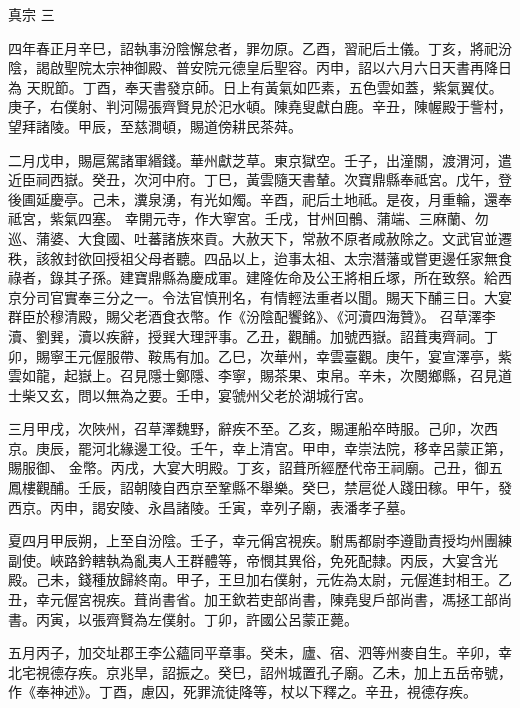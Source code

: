 
\begin{pinyinscope}

 真宗
 三



 四年春正月辛巳，詔執事汾陰懈怠者，罪勿原。乙酉，習祀后土儀。丁亥，將祀汾陰，謁啟聖院太宗神御殿、普安院元德皇后聖容。丙申，詔以六月六日天書再降日為
 天貺節。丁酉，奉天書發京師。日上有黃氣如匹素，五色雲如蓋，紫氣翼仗。庚子，右僕射、判河陽張齊賢見於汜水頓。陳堯叟獻白鹿。辛丑，陳幄殿于訾村，望拜諸陵。甲辰，至慈澗頓，賜道傍耕民茶荈。



 二月戊申，賜扈駕諸軍緡錢。華州獻芝草。東京獄空。壬子，出潼關，渡渭河，遣近臣祠西嶽。癸丑，次河中府。丁巳，黃雲隨天書輦。次寶鼎縣奉祗宮。戊午，登後圃延慶亭。己未，瀵泉湧，有光如燭。辛酉，祀后土地祗。是夜，月重輪，還奉祗宮，紫氣四塞。
 幸開元寺，作大寧宮。壬戌，甘州回鶻、蒲端、三麻蘭、勿巡、蒲婆、大食國、吐蕃諸族來貢。大赦天下，常赦不原者咸赦除之。文武官並遷秩，該敘封欲回授祖父母者聽。四品以上，迨事太祖、太宗潛藩或嘗更邊任家無食祿者，錄其子孫。建寶鼎縣為慶成軍。建隆佐命及公王將相丘塚，所在致祭。給西京分司官實奉三分之一。令法官慎刑名，有情輕法重者以聞。賜天下酺三日。大宴群臣於穆清殿，賜父老酒食衣幣。作《汾陰配饗銘》、《河瀆四海贊》。
 召草澤李瀆、劉巽，瀆以疾辭，授巽大理評事。乙丑，觀酺。加號西嶽。詔葺夷齊祠。丁卯，賜寧王元偓服帶、鞍馬有加。乙巳，次華州，幸雲臺觀。庚午，宴宣澤亭，紫雲如龍，起嶽上。召見隱士鄭隱、李寧，賜茶果、束帛。辛未，次閿鄉縣，召見道士柴又玄，問以無為之要。壬申，宴虢州父老於湖城行宮。



 三月甲戌，次陜州，召草澤魏野，辭疾不至。乙亥，賜運船卒時服。己卯，次西京。庚辰，罷河北緣邊工役。壬午，幸上清宮。甲申，幸崇法院，移幸呂蒙正第，賜服御、
 金幣。丙戌，大宴大明殿。丁亥，詔葺所經歷代帝王祠廟。己丑，御五鳳樓觀酺。壬辰，詔朝陵自西京至鞏縣不舉樂。癸巳，禁扈從人踐田稼。甲午，發西京。丙申，謁安陵、永昌諸陵。壬寅，幸列子廟，表潘孝子墓。



 夏四月甲辰朔，上至自汾陰。壬子，幸元偁宮視疾。駙馬都尉李遵勖責授均州團練副使。峽路鈐轄執為亂夷人王群體等，帝憫其異俗，免死配隸。丙辰，大宴含光殿。己未，錢種放歸終南。甲子，王旦加右僕射，元佐為太尉，元偓進封相王。乙
 丑，幸元偓宮視疾。葺尚書省。加王欽若吏部尚書，陳堯叟戶部尚書，馮拯工部尚書。丙寅，以張齊賢為左僕射。丁卯，許國公呂蒙正薨。



 五月丙子，加交址郡王李公蘊同平章事。癸未，廬、宿、泗等州麥自生。辛卯，幸北宅視德存疾。京兆旱，詔振之。癸巳，詔州城置孔子廟。乙未，加上五岳帝號，作《奉神述》。丁酉，慮囚，死罪流徒降等，杖以下釋之。辛丑，視德存疾。




\end{pinyinscope}
